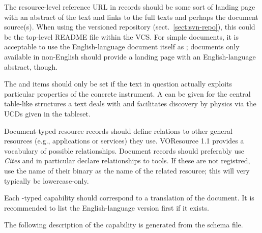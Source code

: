 \documentclass{ivoa}
\begin{document}
The resource-level reference URL in  records should
be some sort of landing page with an abstract of the text and links to
the full texts and perhaps the document source(s).  When using the
versioned repository (sect.~\ref{sect:svn-repo}), this could be the
top-level README file within the VCS.  For simple documents, it is
acceptable to use the English-language document itself as
; documents only available in non-English should
provide a landing page with an English-language abstract, though.

The  and  items should only be set
if the text in question actually exploits particular properties of the
concrete instrument.  A  can be given for the central
table-like structures a text deals with and facilitates discovery by
physics via the UCDs given in the tableset.

Document-typed resource records should define relations to other
general resources (e.g., applications or services)
they use.  VOResource 1.1 provides a vocabulary of possible
relationships. Document records should preferably use \emph{Cites} and
in particular declare relationships to tools.  If these are not
registred, use the name of their binary as the name of the related
resource; this will very typically be lowercase-only.

Each -typed capability should 
correspond to a translation of the document.  It
is recommended to list the English-language version first if it exists.

The following description of the  capability
is generated from the schema file.
\end{document}
